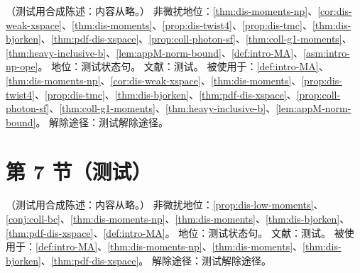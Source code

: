 \begin{assumption}\label{asm:intro-af-coeff}
（测试用合成陈述：内容从略。）
非微扰地位：\cref{thm:dis-moments-np}、\cref{cor:dis-weak-xspace}、\cref{thm:dis-moments}、\cref{prop:dis-twist4}、\cref{prop:dis-tmc}、\cref{thm:dis-bjorken}、\cref{thm:pdf-dis-xspace}、\cref{prop:coll-photon-sf}、\cref{thm:coll-g1-moments}、\cref{thm:heavy-inclusive-b}、\cref{lem:appM-norm-bound}、\cref{def:intro-MA}、\cref{asm:intro-np-ope}。
地位：测试状态句。
文献：测试。
被使用于：\cref{def:intro-MA}、\cref{thm:dis-moments-np}、\cref{cor:dis-weak-xspace}、\cref{thm:dis-moments}、\cref{prop:dis-twist4}、\cref{prop:dis-tmc}、\cref{thm:dis-bjorken}、\cref{thm:pdf-dis-xspace}、\cref{prop:coll-photon-sf}、\cref{thm:coll-g1-moments}、\cref{thm:heavy-inclusive-b}、\cref{lem:appM-norm-bound}。
解除途径：测试解除途径。
\end{assumption}

\section{第 7 节（测试）}\label{sec:intro-misconceptions}

\begin{assumption}\label{asm:intro-growth}
（测试用合成陈述：内容从略。）
非微扰地位：\cref{prop:dis-low-moments}、\cref{conj:coll-bc}、\cref{thm:dis-moments-np}、\cref{thm:dis-moments}、\cref{thm:dis-bjorken}、\cref{thm:pdf-dis-xspace}、\cref{def:intro-MA}。
地位：测试状态句。
文献：测试。
被使用于：\cref{def:intro-MA}、\cref{thm:dis-moments-np}、\cref{thm:dis-moments}、\cref{thm:dis-bjorken}、\cref{thm:pdf-dis-xspace}。
解除途径：测试解除途径。
\end{assumption}

